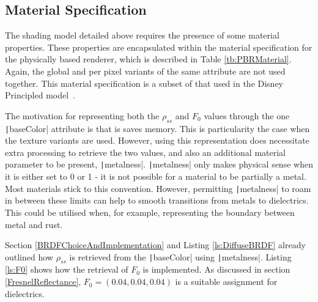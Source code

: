 
\subsection{Material Specification} \label{PBRMaterialSpecification}

The shading model detailed above requires the presence of some material properties. These properties are encapsulated within the material specification for the physically based renderer, which is described in Table \ref{tb:PBRMaterial}. Again, the global and per pixel variants of the same attribute are not used together. This material specification is a subset of that used in the Disney Principled model~\cite{Burley2012Physically}.

The motivation for representing both the \begin{math}\rho_{ss}\end{math} and \begin{math}F_0\end{math} values through the one \texttt|baseColor| attribute is that is saves memory. This is particularity the case when the texture variants are used.  However, using this representation does necessitate extra processing to retrieve the two values, and also an additional material parameter to be present, \texttt|metalness|. \texttt|metalness| only makes physical sense when it is either set to 0 or 1 - it is not possible for a material to be partially a metal. Most materials stick to this convention. However, permitting \texttt|metalness| to roam in between these limits can help to smooth transitions from metals to dielectrics. This could be utilised when, for example, representing the boundary between metal and rust.

Section \ref{BRDFChoiceAndImplementation} and Listing \ref{ls:DiffuseBRDF} already outlined how \begin{math}\rho_{ss}\end{math} is retrieved from the \texttt|baseColor| using \texttt|metalness|. Listing \ref{ls:F0} shows how the retrieval of \begin{math}F_0\end{math} is implemented. As discussed in section \ref{FresnelReflectance}, \begin{math}F_0 = (0.04, 0.04, 0.04)\end{math} is a suitable assignment for dielectrics.

